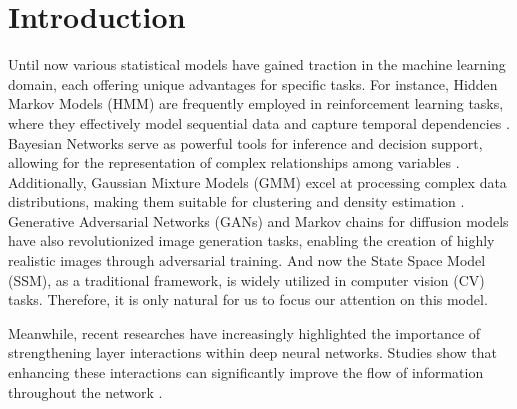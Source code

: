 \section{Introduction}
\label{Introduction}

Until now various statistical models have gained traction in the machine learning domain, each offering unique advantages for specific tasks. For instance, Hidden Markov Models (HMM) are frequently employed in reinforcement learning tasks, where they effectively model sequential data and capture temporal dependencies \citep{sloin2007support, dethlefs2011hierarchical}. Bayesian Networks serve as powerful tools for inference and decision support, allowing for the representation of complex relationships among variables \citep{friedman1997bayesian,chen2012good}. Additionally, Gaussian Mixture Models (GMM) excel at processing complex data distributions, making them suitable for clustering and density estimation \citep{reynolds2009gaussian,viroli2019deep}. Generative Adversarial Networks (GANs) \cite{goodfellow2020generative} and Markov chains for diffusion models \citep{sohldickstein2015deepunsupervisedlearningusing,ho2020denoisingdiffusionprobabilisticmodels} have also revolutionized image generation tasks, enabling the creation of highly realistic images through adversarial training. And now the State Space Model (SSM), as a traditional framework, is widely utilized in computer vision (CV) \citep{gu2023mamba,liu2024vmamba} tasks. Therefore, it is only natural for us to focus our attention on this model.

%

Meanwhile, recent researches have increasingly highlighted the importance of strengthening layer interactions within deep neural networks. Studies show that enhancing these interactions can significantly improve the flow of information throughout the network \citep{he2016deep,huang2018denselyconnectedconvolutionalnetworks,zhao2021recurrence,fang2023cross}. 


